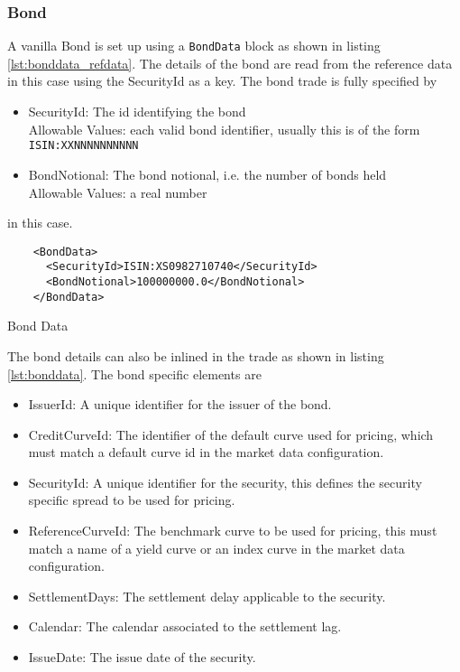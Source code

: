 \subsubsection{Bond}
\label{ss:bond}

A vanilla Bond is set up using a {\tt BondData} block as shown in listing \ref{lst:bonddata_refdata}. The details of the
bond are read from the reference data in this case using the SecurityId as a key. The bond trade is fully specified by

\begin{itemize}
\item SecurityId: The id identifying the bond\\
  Allowable Values: each valid bond identifier, usually this is of the form \verb+ISIN:XXNNNNNNNNNN+
\item BondNotional: The bond notional, i.e. the number of bonds held\\
  Allowable Values: a real number
\end{itemize}

in this case.

\begin{listing}[H]
\begin{verbatim}
    <BondData>
      <SecurityId>ISIN:XS0982710740</SecurityId>
      <BondNotional>100000000.0</BondNotional>
    </BondData>
\end{verbatim}
\caption{Bond Data}
\label{lst:bonddata_refdata}
\end{listing}

The bond details can also be inlined in the trade as shown in listing \ref{lst:bonddata}. The bond specific elements are

\begin{itemize}
\item IssuerId: A unique identifier for the issuer of the bond.
\item CreditCurveId: The identifier of the default curve used for pricing, which must
match a default curve id in the market data configuration.
\item SecurityId: A unique identifier for the security, this defines the security specific spread to be used for pricing.
\item ReferenceCurveId: The benchmark curve to be used for pricing, this must match a name of a yield curve or an index curve in the market data configuration.
\item SettlementDays: The settlement delay applicable to the security.
\item Calendar: The calendar associated to the settlement lag.
\item IssueDate: The issue date of the security.
\end{itemize}

